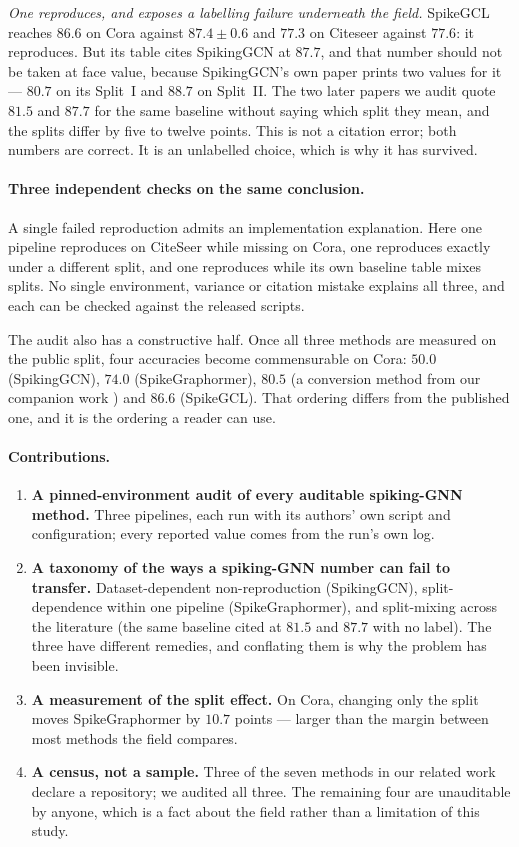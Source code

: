 \documentclass[10pt,twocolumn]{article}
\begin{document}
\emph{One reproduces, and exposes a labelling failure underneath the field.} SpikeGCL reaches $86.6$
on Cora against $87.4 \pm 0.6$ and $77.3$ on Citeseer against $77.6$: it reproduces. But its table
cites SpikingGCN at $87.7$, and that number should not be taken at face value, because SpikingGCN's
own paper prints two values for it --- $80.7$ on its Split~I and $88.7$ on Split~II. The two later
papers we audit quote $81.5$ and $87.7$ for the same baseline without saying which split they mean,
and the splits differ by five to twelve points. This is not a citation error; both numbers are
correct. It is an unlabelled choice, which is why it has survived.

\paragraph{Three independent checks on the same conclusion.} A single failed reproduction admits an
implementation explanation. Here one pipeline reproduces on CiteSeer while missing on Cora, one
reproduces exactly under a different split, and one reproduces while its own baseline table mixes
splits. No single environment, variance or citation mistake explains all three, and each can be
checked against the released scripts.

The audit also has a constructive half. Once all three methods are measured on the public split,
four accuracies become commensurable on Cora: $50.0$ (SpikingGCN), $74.0$ (SpikeGraphormer), $80.5$
(a conversion method from our companion work \citep{companion}) and $86.6$ (SpikeGCL). That ordering
differs from the published one, and it is the ordering a reader can use.

\paragraph{Contributions.}
\begin{enumerate}\itemsep2pt
\item \textbf{A pinned-environment audit of every auditable spiking-GNN method.} Three pipelines, each
run with its authors' own script and configuration; every reported value comes from the run's own
log.
\item \textbf{A taxonomy of the ways a spiking-GNN number can fail to transfer.} Dataset-dependent
non-reproduction (SpikingGCN), split-dependence within one pipeline (SpikeGraphormer), and
split-mixing across the literature (the same baseline cited at $81.5$ and $87.7$ with no label). The
three have different remedies, and conflating them is why the problem has been invisible.
\item \textbf{A measurement of the split effect.} On Cora, changing only the split moves
SpikeGraphormer by $10.7$ points --- larger than the margin between most methods the field compares.
\item \textbf{A census, not a sample.} Three of the seven methods in our related work declare a
repository; we audited all three. The remaining four are unauditable by anyone, which is a fact about
the field rather than a limitation of this study.
\end{enumerate}
\end{document}
